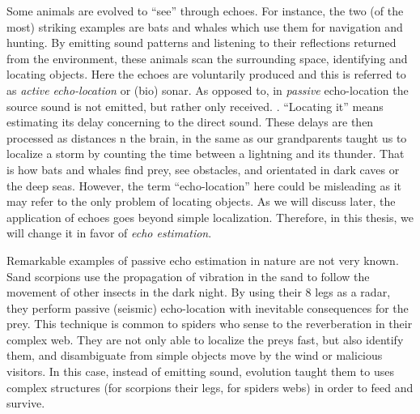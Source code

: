 \mynewline
Some animals are evolved to ``see'' through echoes.
For instance, the two (of the most) striking examples are bats and whales which use them for navigation and hunting.
By emitting sound patterns and listening to their reflections returned from the environment, these animals scan the surrounding space, identifying and locating objects.
Here the echoes are voluntarily produced and this is referred to as \textit{active echo-location} or (bio) sonar.
As opposed to, in \textit{passive} echo-location the source sound is not emitted, but rather only received.
.
``Locating it'' means estimating its delay concerning to the direct sound.
These delays are then processed as distances n the brain, in the same as our grandparents taught us to localize a storm by counting the time between a lightning and its thunder.
That is how bats and whales find prey, see obstacles, and orientated in dark caves or the deep seas.
However, the term ``echo-location'' here could be misleading as it may refer to the only problem of locating objects.
As we will discuss later, the application of echoes goes beyond simple localization.
Therefore, in this thesis, we will change it in favor of \textit{echo estimation}.

\mynewline
Remarkable examples of passive echo estimation in nature are not very known.
Sand scorpions use the propagation of vibration in the sand to follow the movement of other insects in the dark night.
By using their 8 legs as a radar, they perform passive (seismic) echo-location with inevitable consequences for the prey.
This technique is common to spiders who sense to the reverberation in their complex web.
They are not only able to localize the preys fast, but also identify them, and disambiguate from simple objects move by the wind or malicious visitors.
In this case, instead of emitting sound, evolution taught them to uses complex structures (for scorpions their legs, for spiders webs) in order to feed and survive.

